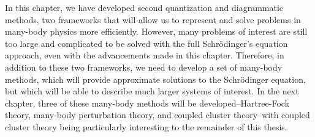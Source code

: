 In this chapter, we have developed second quantization and diagrammatic methods, two frameworks that will allow us to represent and solve problems in many-body physics more efficiently. However, many problems of interest are still too large and complicated to be solved with the full Schr\"{o}dinger's equation approach, even with the advancements made in this chapter. Therefore, in addition to these two frameworks, we need to develop a set of many-body methods, which will provide approximate solutions to the Schr\"{o}dinger equation, but which will be able to describe much larger systems of interest. In the next chapter, three of these many-body methods will be developed--Hartree-Fock theory, many-body perturbation theory, and coupled cluster theory--with coupled cluster theory being particularly interesting to the remainder of this thesis.

